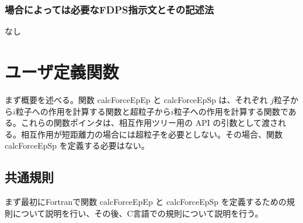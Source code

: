 \subsubsection{場合によっては必要なFDPS指示文とその記述法}
なし


\section{ユーザ定義関数}
\label{sec:user_defined_function}
まず概要を述べる。関数 calcForceEpEp と calcForceEpSp は、それぞれ $j$粒子から$i$粒子への作用を計算する関数と超粒子から$i$粒子への作用を計算する関数である。これらの関数ポインタは、相互作用ツリー用の API の引数として渡される。相互作用が短距離力の場合には超粒子を必要としない。その場合、関数 calcForceEpSp を定義する必要はない。

\subsection{共通規則}
まず最初にFortranで関数 calcForceEpEp と calcForceEpSp を定義するための規則について説明を行い、その後、C言語での規則について説明を行う。
